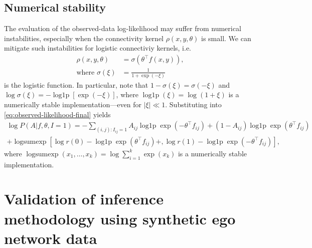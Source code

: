 \documentclass{scrartcl}
\newcommand{\expit}{\sigma}
\newcommand{\transpose}[1]{#1^\intercal}
\DeclareMathOperator{\logp}{log1p}
\DeclareMathOperator{\logsumexp}{logsumexp}
\newcommand{\abs}[1]{\left|#1\right|}
\begin{document}
\begin{refsection}
\subsection{Numerical stability\label{app:numeric-stability}}

The evaluation of the observed-data log-likelihood may suffer from numerical instabilities, especially when the connectivity kernel $\rho(x, y, \theta)$ is small. We can mitigate such instabilities for logistic connectiviy kernels, i.e.
\begin{align}
    \rho(x,y,\theta)&=\expit(\transpose{\theta}f(x,y)),\\
    \text{where }\expit(\xi)&=\frac{1}{1+\exp(-\xi)}
\end{align}
is the logistic function. In particular, note that $1 - \expit(\xi) = \expit(-\xi)$ and $\log\expit(\xi)=-\logp\left[\exp(-\xi)\right]$, where $\logp(\xi)=\log(1 + \xi)$ is a numerically stable implementation---even for $\abs{\xi}\ll 1$. Substituting into \cref{eq:observed-likelihood-final} yields
\begin{multline}
    \log P(A|f,\theta,I=1)= -\sum_{(i,j):I_{ij}=1} A_{ij}\logp\exp\left(-\transpose{\theta}f_{ij}\right)+\left(1-A_{ij}\right)\logp\exp\left(\transpose{\theta}f_{ij}\right) \\
    + \logsumexp\left[\log r(0) - \logp\exp\left(\transpose{\theta}f_{ij}\right) + ,\log r(1)-\logp\exp\left(-\transpose{\theta}f_{ij}\right)\right],
\end{multline}
where $\logsumexp(x_1, \ldots, x_k)=\log\sum_{i=1}^k\exp(x_k)$ is a numerically stable implementation.

\section{Validation of inference methodology using synthetic ego network data\label{app:inference-validation}}


\end{refsection}
\end{document}
